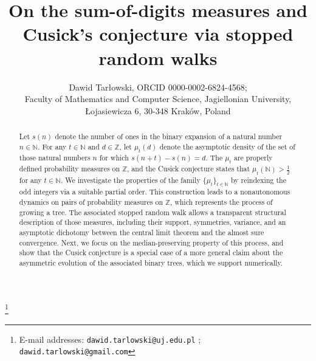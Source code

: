 \documentclass[10pt]{amsart}
\theoremstyle{definition}
\numberwithin{equation}{section}
\newcommand{\N}{\mathbb{N}}
\newcommand{\Z}{\mathbb{Z}}
\begin{document}
\title[On the sum-of-digits measures and Cusick's conjecture via stopped random walks]{On the sum-of-digits measures and Cusick's conjecture via stopped random walks}

     \author[D.\ Tar\l{}owski]{Dawid Tar\l{}owski, ORCID 0000-0002-6824-4568; \\
      Faculty of Mathematics and Computer Science,
     Jagiellonian University,   \L{}ojasiewicza 6, 30-348 Krak\'{o}w, Poland}
  \thanks{E-mail addresses: \texttt{dawid.tarlowski@uj.edu.pl} ; \texttt{dawid.tarlowski@gmail.com}}

\begin{abstract}
Let $s(n)$ denote the number of ones  in the binary expansion of a natural 
number $n\in\mathbb{N}$. For any $t\in\mathbb{N}$ and $d\in\mathbb{Z}$, 
let $\mu_t(d)$ denote the asymptotic density of the set of those natural numbers $n$ for which $s(n+t)-s(n)=d$. 
The $\mu_t$ are properly defined probability measures on $\Z$, 
and the Cusick conjecture states that $\mu_t(\mathbb{N})>\frac{1}{2}$ for any 
$t\in\mathbb{N}$. We investigate the  properties of the family $\{\mu_t\}_{t\in\N}$
 by reindexing the odd integers via a suitable partial order. 
This construction leads to a nonautonomous dynamics on pairs of probability
 measures on $\Z$, which represents the process of growing a tree. The associated stopped random walk allows a transparent structural description of those measures, including their support, 
symmetries, variance, and an asymptotic dichotomy between the central limit theorem and the almost sure convergence. Next, we focus on  the median-preserving property of this process, and show that the Cusick conjecture is a special case of a more general claim about the asymmetric evolution of the associated binary trees, which we support numerically.
   

\end{abstract}
\end{document}
